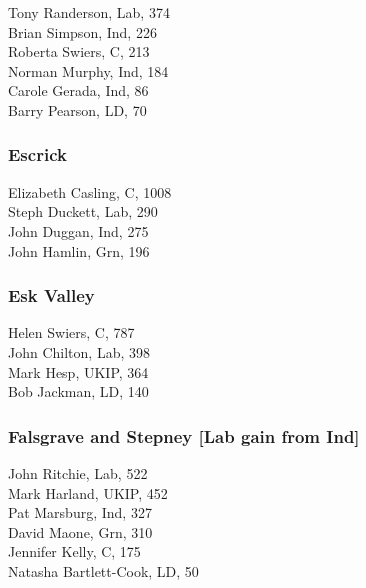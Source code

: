 \documentclass[a4paper,openany,10pt]{book}
\begin{document}


Tony Randerson, Lab, 374\\
Brian Simpson, Ind, 226\\
Roberta Swiers, C, 213\\
Norman Murphy, Ind, 184\\
Carole Gerada, Ind, 86\\
Barry Pearson, LD, 70\\


\subsubsection*{Escrick}



Elizabeth Casling, C, 1008\\
Steph Duckett, Lab, 290\\
John Duggan, Ind, 275\\
John Hamlin, Grn, 196\\


\subsubsection*{Esk Valley}



Helen Swiers, C, 787\\
John Chilton, Lab, 398\\
Mark Hesp, UKIP, 364\\
Bob Jackman, LD, 140\\


\subsubsection*{Falsgrave and Stepney \hspace*{\fill}\nolinebreak[1]%
\enspace\hspace*{\fill}
[Lab gain from Ind]}



John Ritchie, Lab, 522\\
Mark Harland, UKIP, 452\\
Pat Marsburg, Ind, 327\\
David Maone, Grn, 310\\
Jennifer Kelly, C, 175\\
Natasha Bartlett-Cook, LD, 50\\
\end{document}
